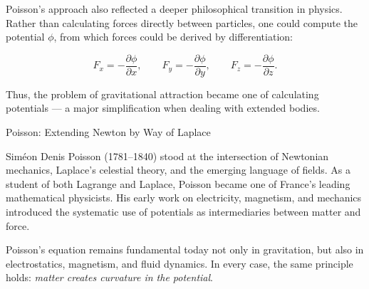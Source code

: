 Poisson’s approach also reflected a deeper philosophical transition in physics. Rather than calculating forces directly between particles, one could compute the potential \(\phi\), from which forces could be derived by differentiation:

\[
F_x = - \frac{\partial \phi}{\partial x}, \qquad
F_y = - \frac{\partial \phi}{\partial y}, \qquad
F_z = - \frac{\partial \phi}{\partial z}.
\]

Thus, the problem of gravitational attraction became one of calculating potentials — a major simplification when dealing with extended bodies.

\begin{HistoricalSidebar}{Poisson: Extending Newton by Way of Laplace}

Siméon Denis Poisson (1781–1840) stood at the intersection of Newtonian mechanics, Laplace’s celestial theory, and the emerging language of fields. As a student of both Lagrange and Laplace, Poisson became one of France’s leading mathematical physicists. His early work on electricity, magnetism, and mechanics introduced the systematic use of potentials as intermediaries between matter and force.

Poisson’s equation remains fundamental today not only in gravitation, but also in electrostatics, magnetism, and fluid dynamics. In every case, the same principle holds: \emph{matter creates curvature in the potential}.

\end{HistoricalSidebar}


